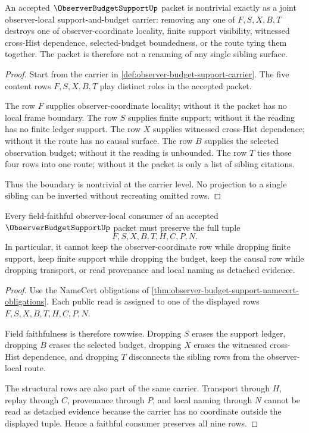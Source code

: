 \begin{theorem}
\label{thm:observer-budget-support-nontrivial-boundary}
An accepted $\ObserverBudgetSupportUp$ packet is nontrivial exactly as a joint observer-local support-and-budget carrier: removing any one of $F,S,X,B,T$ destroys one of observer-coordinate locality, finite support visibility, witnessed cross-Hist dependence, selected-budget boundedness, or the route tying them together. The packet is therefore not a renaming of any single sibling surface.
\end{theorem}
\begin{proof}
Start from the carrier in \autoref{def:observer-budget-support-carrier}. The five content rows $F,S,X,B,T$ play distinct roles in the accepted packet.

The row $F$ supplies observer-coordinate locality; without it the packet has no local frame boundary. The row $S$ supplies finite support; without it the reading has no finite ledger support. The row $X$ supplies witnessed cross-Hist dependence; without it the route has no causal surface. The row $B$ supplies the selected observation budget; without it the reading is unbounded. The row $T$ ties those four rows into one route; without it the packet is only a list of sibling citations.

Thus the boundary is nontrivial at the carrier level. No projection to a single sibling can be inverted without recreating omitted rows.
\end{proof}

\begin{theorem}
\label{thm:observer-budget-support-field-faithfulness}
Every field-faithful observer-local consumer of an accepted $\ObserverBudgetSupportUp$ packet must preserve the full tuple
$$
F,S,X,B,T,H,C,P,N.
$$
In particular, it cannot keep the observer-coordinate row while dropping finite support, keep finite support while dropping the budget, keep the causal row while dropping transport, or read provenance and local naming as detached evidence.
\end{theorem}
\begin{proof}
Use the NameCert obligations of \autoref{thm:observer-budget-support-namecert-obligations}. Each public read is assigned to one of the displayed rows $F,S,X,B,T,H,C,P,N$.

Field faithfulness is therefore rowwise. Dropping $S$ erases the support ledger, dropping $B$ erases the selected budget, dropping $X$ erases the witnessed cross-Hist dependence, and dropping $T$ disconnects the sibling rows from the observer-local route.

The structural rows are also part of the same carrier. Transport through $H$, replay through $C$, provenance through $P$, and local naming through $N$ cannot be read as detached evidence because the carrier has no coordinate outside the displayed tuple. Hence a faithful consumer preserves all nine rows.
\end{proof}

